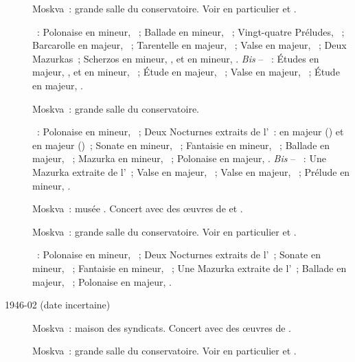 \begin{description}
 \item[]
 Moskva~: grande salle du conservatoire.
 Voir en particulier \citet[p.~442]{Milshteyn82a} et
 \citet[p.~394]{Nikonovich08}.

 \textsc{\Chopin{}}~: Polonaise en \kC \Sharp mineur,  ~;
 Ballade en \kG mineur, ~; Vingt-quatre Préludes, ~;
 Barcarolle en \kF \Sharp majeur, ~; Tarentelle en \kA \Flat
 majeur, ~; Valse  en \kA \Flat majeur, 
 ~; Deux Mazurkas~; Scherzos en \kB mineur, , et en \kB
 \Flat mineur, .
 \emph{Bis} -- \textsc{\Chopin{}}~: Études en \kG \Flat majeur, 
 , et en \kC \Sharp mineur,  ~; Étude en \kF
 majeur,  ~; Valse  en \kA \Flat majeur,
  ~; Étude en \kF majeur,  .
 \item[]
 Moskva~: grande salle du conservatoire.

 \textsc{\Chopin{}}~: Polonaise en \kC \Sharp mineur,  ~;
 Deux Nocturnes extraits de l'~: en \kF \Sharp majeur ()
 et en \kF majeur ()~; Sonate en \kB \Flat mineur, ~;
 Fantaisie en \kF mineur, ~; Ballade en \kA \Flat majeur,
 ~; Mazurka en \kC \Sharp mineur,  ~; Polonaise
 en \kA \Flat majeur, .
 \emph{Bis} -- \textsc{\Chopin{}}~: Une Mazurka extraite de l'~;
 Valse  en \kG \Flat majeur,  ~; Valse
  en \kD \Flat majeur,  ~; Prélude en \kD
 mineur,  .
 \item[]
 Moskva~: musée \Scriabine{}.
 Concert avec des œuvres de \Chopin{} et \Scriabine{}.
 \item[]
 Moskva~: grande salle du conservatoire.
 Voir en particulier \citet[p.~442]{Milshteyn82a} et
 \citet[p.~394]{Nikonovich08}.

 \textsc{\Chopin{}}~: Polonaise en \kC \Sharp mineur,  ~;
 Deux Nocturnes extraits de l'~; Sonate en \kB \Flat mineur,
 ~; Fantaisie en \kF mineur, ~; Une Mazurka extraite de
 l'~; Ballade en \kA \Flat majeur, ~; Polonaise en \kA
 \Flat majeur, .
 \item[1946-02 (date incertaine)]
 Moskva~: maison des syndicats.
 Concert avec des œuvres de \Scriabine{}.
 \item[]
 Moskva~: grande salle du conservatoire.
 Voir en particulier \citet[p.~442]{Milshteyn82a} et
 \citet[p.~394]{Nikonovich08}.


\end{description}
